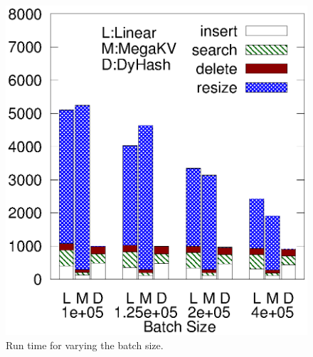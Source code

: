 \begin{figure}[ht]
\begin{minipage}{0.19\linewidth}
		\centerline{\dsali}
	\end{minipage}
	\begin{minipage}{0.19\linewidth}\centering
		\includegraphics[width=\linewidth]{pic/dynamic/random/diff_batch_size.eps}
		\centerline{\dsrandom}
	\end{minipage}
	\caption{Run time for varying the batch size.}
	\label{fig:vary-batch-size}
\end{figure}


